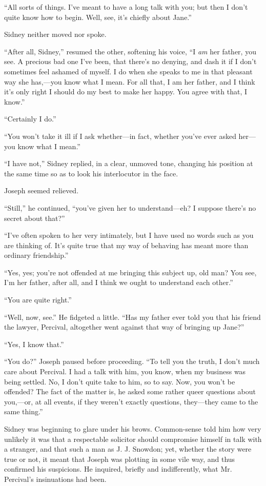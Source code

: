 {}``All sorts of things. I've meant to have a long talk with you; but
then I don't quite know how to begin. Well, see, it's chiefly about
Jane.''

Sidney neither moved nor spoke.

``After all, Sidney,'' resumed the other, softening his voice, ``I
\emph{am} her father, you see. A precious bad one I've been, that
there's no denying, and dash it if I don't sometimes feel ashamed of
myself. I do when she speaks to me in that pleasant way she has,---you
know what I mean. For all that, I am her father, and I think it's only
right I should do my best to make her happy. You agree with that, I
know.''

``Certainly I do.''

``You won't take it ill if I ask whether---in fact, whether you've ever
asked her---you know what I mean.''

``I have not,'' Sidney replied, in a clear, unmoved tone, changing his
position at the same time so as to look his interlocutor in the face.

Joseph seemed relieved.

{}``Still,'' he continued, ``you've given her to understand---eh? I
suppose there's no secret about that?''

``I've often spoken to her very intimately, but I have used no words
such as you are thinking of. It's quite true that my way of behaving has
meant more than ordinary friendship.''

``Yes, yes; you're not offended at me bringing this subject up, old man?
You see, I'm her father, after all, and I think we ought to understand
each other.''

``You are quite right.''

``Well, now, see.'' He fidgeted a little. ``Has my father ever told you
that his friend the lawyer, Percival, altogether went against that way
of bringing up Jane?''

``Yes, I know that.''

``You do?'' Joseph paused before proceeding. ``To tell you the truth, I
don't much care about Percival. I had a talk with him, you know, when my
business was being settled. No, I don't quite take to him, so to say.
Now, you won't be offended? The fact {}of the matter is, he asked some
rather queer questions about you,---or, at all events, if they weren't
exactly questions, they---they came to the same thing.''

Sidney was beginning to glare under his brows. Common-sense told him how
very unlikely it was that a respectable solicitor should compromise
himself in talk with a stranger, and that such a man as J. J. Snowdon;
yet, whether the story were true or not, it meant that Joseph was
plotting in some vile way, and thus confirmed his suspicions. He
inquired, briefly and indifferently, what Mr. Percival's insinuations
had been.

